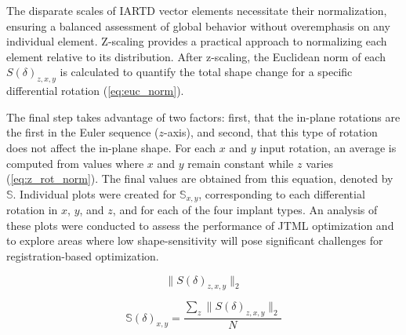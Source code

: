 The disparate scales of IARTD vector elements necessitate their normalization, ensuring a balanced assessment of global behavior without overemphasis on any individual element.
Z-scaling provides a practical approach to normalizing each element relative to its distribution.
After z-scaling, the Euclidean norm of each $S(\delta)_{z,x,y}$ is calculated to quantify the total shape change for a specific differential rotation (\cref{eq:euc_norm}).

The final step takes advantage of two factors: first, that the in-plane rotations are the first in the Euler sequence ($z$-axis), and second, that this type of rotation does not affect the in-plane shape.
For each $x$ and $y$ input rotation, an average is computed from values where $x$ and $y$ remain constant while $z$ varies (\cref{eq:z_rot_norm}). The final values are obtained from this equation, denoted by $\mathbb{S}$.
Individual plots were created for $\mathbb{S}_{x,y}$, corresponding to each differential rotation in $x$, $y$, and $z$, and for each of the four implant types.
An analysis of these plots were conducted to assess the performance of JTML optimization and to explore areas where low shape-sensitivity will pose significant challenges for registration-based optimization.

\begin{equation}
	\label{eq:euc_norm}
	\|S(\delta)_{z,x,y}\|_{2}
\end{equation}

\begin{equation}
	\label{eq:z_rot_norm}
	\mathbb{S}(\delta)_{x,y} = \dfrac{\sum_{z} \| S(\delta)_{z,x,y} \|_{2}}{N}
\end{equation}

